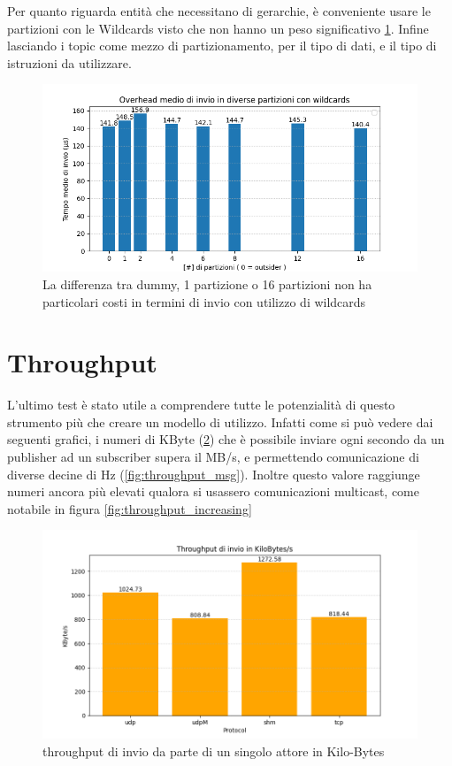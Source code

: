 Per quanto riguarda entità che necessitano di gerarchie, è conveniente usare le partizioni con le Wildcards visto che non hanno un peso significativo \ref{fig:test2wildcards}. Infine lasciando i topic come mezzo di partizionamento, per il tipo di dati, e il tipo di istruzioni da utilizzare.

\begin{figure}[H]
    \centering
    \includegraphics[width=\textwidth]{./results/test2_wildcards.png}
    \caption{La differenza tra dummy, 1 partizione o 16 partizioni non ha particolari costi in termini di invio con utilizzo di wildcards}
        \label{fig:test2wildcards}
\end{figure}



\section{Throughput}
L'ultimo test è stato utile a comprendere tutte le potenzialità di questo strumento più che creare un modello di utilizzo. Infatti come si può vedere dai seguenti grafici, i numeri di KByte (\ref{fig:throughput_Byte}) che è possibile inviare ogni secondo da un publisher ad un subscriber supera il MB/s, e permettendo comunicazione di diverse decine di Hz (\ref{fig:throughput_msg}). Inoltre questo valore raggiunge numeri ancora più elevati qualora si usassero comunicazioni multicast, come notabile in figura \ref{fig:throughput_increasing}
\begin{figure}[H]
    \includegraphics[width=\textwidth]{./results/test3_throughput.png} 
        \caption{throughput di invio da parte di un singolo attore in Kilo-Bytes} %
        \label{fig:throughput_Byte}
\end{figure}

